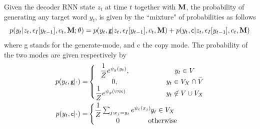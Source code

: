 Given the decoder RNN state $z_t$ at time $t$ together with $\mathbf{M}$,      
the probability of generating any target word $y_t$,  is given by the ``mixture" of probabilities as follows
\begin{equation}
p(y_t|z_t, \epsilon_I[y_{t-1}], c_t, \mathbf{M}; \theta) = 
p(y_t, \textsf{\small g} | z_t, \epsilon_I[y_{t-1}], c_t, \mathbf{M}) + 
p(y_t, \textsf{\small c}| z_t, \epsilon_I[y_{t-1}], c_t, \mathbf{M}) \label{cp3.eq.mix}
\end{equation}
where \textsf{\small g} stands for the generate-mode, and \textsf{\small c} the copy mode. The probability of the two modes 
are given respectively by
\begin{eqnarray} %
\label{cp3.eq.pg}
p(y_t, \textsf{\small g}|\cdot) 
=&
 \left \{\begin{matrix}
\dfrac{1}{Z}e^{\psi_g(y_t)},                       \;\;\; \qquad& \;\;\; y_t \in V \\
0,                                                                          \;\;\; \qquad&\;\;\; y_t \in V_X \cap \bar{V}\\
\dfrac{1}{Z}e^{\psi_g(\textsc{unk})} \;\;\;\;     \;\;\; \qquad& \;\;\; y_t \not \in V \cup V_X     \\
\end{matrix}\right. \\
\label{cp3.eq.pc}
	p(y_t, \textsf{\small c}|\cdot)
	=& 
	\left \{\begin{matrix}
\dfrac{1}{Z}\sum_{j:x_j=y_t} e^{\psi_c(x_j)},  \hspace{-17pt} &y_t \in V_X \\
0 &\text{otherwise} 
\end{matrix}\right. 
\end{eqnarray}

